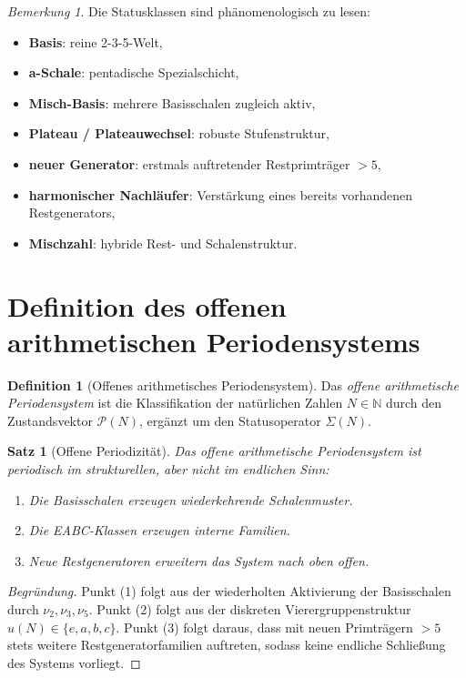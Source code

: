 \documentclass[11pt,a4paper]{article}
\theoremstyle{plain}
\newtheorem{satz}{Satz}
\theoremstyle{definition}
\newtheorem{definition}{Definition}
\theoremstyle{remark}
\newtheorem{bemerkung}{Bemerkung}
\begin{document}
\begin{bemerkung}
Die Statusklassen sind phänomenologisch zu lesen:
\begin{itemize}
    \item \textbf{Basis}: reine 2-3-5-Welt,
    \item \textbf{a-Schale}: pentadische Spezialschicht,
    \item \textbf{Misch-Basis}: mehrere Basisschalen zugleich aktiv,
    \item \textbf{Plateau / Plateauwechsel}: robuste Stufenstruktur,
    \item \textbf{neuer Generator}: erstmals auftretender Restprimträger \(>5\),
    \item \textbf{harmonischer Nachläufer}: Verstärkung eines bereits vorhandenen Restgenerators,
    \item \textbf{Mischzahl}: hybride Rest- und Schalenstruktur.
\end{itemize}
\end{bemerkung}

\section{Definition des offenen arithmetischen Periodensystems}

\begin{definition}[Offenes arithmetisches Periodensystem]
Das \emph{offene arithmetische Periodensystem} ist die Klassifikation der natürlichen Zahlen \(N\in\mathbb{N}\) durch den Zustandsvektor \(\mathcal P(N)\), ergänzt um den Statusoperator \(\Sigma(N)\).
\end{definition}

\begin{satz}[Offene Periodizität]
Das offene arithmetische Periodensystem ist periodisch im strukturellen, aber nicht im endlichen Sinn:
\begin{enumerate}
    \item Die Basisschalen erzeugen wiederkehrende Schalenmuster.
    \item Die EABC-Klassen erzeugen interne Familien.
    \item Neue Restgeneratoren erweitern das System nach oben offen.
\end{enumerate}
\end{satz}

\begin{proof}[Begründung]
Punkt (1) folgt aus der wiederholten Aktivierung der Basisschalen durch \(\nu_2,\nu_3,\nu_5\). 
Punkt (2) folgt aus der diskreten Vierergruppenstruktur \(u(N)\in\{e,a,b,c\}\). 
Punkt (3) folgt daraus, dass mit neuen Primträgern \(>5\) stets weitere Restgeneratorfamilien auftreten, sodass keine endliche Schließung des Systems vorliegt.
\end{proof}
\end{document}
